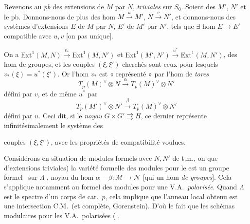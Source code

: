 \documentclass[11pt,a4paper]{article}
\begin{document}
Revenons au \emph{pb} des extensions de $M$ par $N$, \emph{triviales} sur
$S_0$. Soient \ill{} \ill{} des $M'$, $N'$ et \ill{} \ill{} le \ill{} pb.
Donnons-nous de plus des hom $M\xrightarrow{u}M'$, $N\xrightarrow{v}N'$, et
donnons-nous des systèmes d'extensions $E$ de $M$ par $N$, $E'$ de $M'$ par
$N'$,  \struck{\ill{}} tels que
$\exists$ \struck{\ill{}} hom $E\to E'$ compatible avec $u,v$ [on
\ill{} pas \ill{} unique].

On a \ill{} $\mathrm{Ext}^1(M,N)\xrightarrow{v_*}\mathrm{Ext}^1(M,N')$ et
$\mathrm{Ext}^1(M',N')\xrightarrow{u^*}\mathrm{Ext}^1(M,N')$, des hom de
groupes, \struck{\ill{} \ill{} \ill{}} et les couples $(\xi,\xi')$
cherchés sont ceux pour lesquels $v_*(\xi)=u^*(\xi')$. Or l'hom $v_*$ est
« représenté » par l'hom de \emph{tores}
\[
  T_p(M)^{\vee}\otimes N\xrightarrow{\ \alpha\ }T_p(M)^{\vee}\otimes N'
\]
défini par $v$, et de même $u^*$ par
\[
  T_p(M')^{\vee}\otimes N'\xrightarrow{\ \beta\ }T_p(M)^{\vee}\otimes N'
\]
défini par $u$. Ceci dit, si  le \emph{noyau}
  $G\times
G'\rightrightarrows H$, \add{\ill{} \ill{}} ce dernier représente
infinitésimalement le système des

couples $(\xi,\xi')$, avec les propriétés de compatibilité voulues.

Considérons en \ill{} \ill{} \ill{} situation de modules formels
 avec $N,N'$ de t.m., on
\ill{} \ill{} que \ill{} \ill{} \ill{} d'extensions triviales) la variété
formelle des modules pour le \ill{} \ill{} est un groupe formel \ sur $\Lambda$ , noyau du hom
$\alpha-\beta\colon\mathcal{M}\to\mathcal{N}$ \struck{\ill{}} [qui \ill{}
un hom \emph{de groupes}]. Cela s'applique notamment au \ill{} formel des
modules pour une V.A.\ \emph{polarisée}. Quand $\Lambda$ est le spectre
\ill{} d'un corps de car.\ $p$, cela implique \ill{} \ill{} que l'anneau
local obtenu est \struck{\ill{}} une intersection C.M.\ (et
\struck{\ill{}} \ill{} \ill{} complète, \ill{} Gorenstein). D'où le fait
que les schémas \struck{\ill{}} modulaires pour les V.A.\ polarisées
 (\ill{} \ill{}, \ill{} \ill{}
\end{document}
